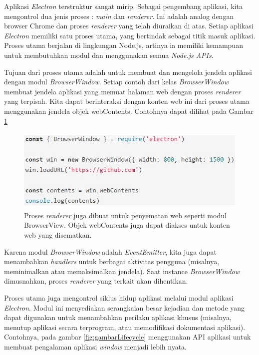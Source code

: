 Aplikasi \textit{Electron} terstruktur sangat mirip. Sebagai pengembang aplikasi, kita mengontrol dua jenis proses : \textit{main} dan \textit{renderer}. Ini adalah analog dengan browser Chrome dan proses \textit{renderer} yang telah diuraikan di atas. Setiap aplikasi \textit{Electron} memiliki satu proses utama, yang bertindak sebagai titik masuk aplikasi. Proses utama berjalan di lingkungan Node.js, artinya ia memiliki kemampuan untuk membutuhkan modul dan menggunakan semua \textit{Node.js APIs}.

Tujuan dari proses utama adalah untuk membuat dan mengelola jendela aplikasi dengan modul \textit{BrowserWindow}. Setiap contoh dari kelas \textit{BrowserWindow} membuat jendela aplikasi yang memuat halaman web dengan proses \textit{renderer} yang terpisah. Kita dapat berinteraksi dengan konten web ini dari proses utama menggunakan  jendela objek webContents. Contohnya dapat dilihat pada Gambar \ref{fig:gambarBrowserWindow}

\begin{figure}[H]
    \centering
    \includegraphics[width=12cm, height=4cm]{Gambar/BrowserWindow.jpg}
    \caption{Proses \textit{renderer} juga dibuat untuk penyematan web seperti modul BrowserView. Objek webContents juga dapat diakses untuk konten web yang disematkan.}
    \label{fig:gambarBrowserWindow}
\end{figure}

Karena modul \textit{BrowserWindow} adalah \textit{EventEmitter}, kita juga dapat menambahkan \textit{handlers} untuk berbagai aktivitas pengguna (misalnya, meminimalkan atau memaksimalkan jendela). Saat instance \textit{BrowserWindow} dimusnahkan, proses \textit{renderer} yang terkait akan dihentikan.

Proses utama juga mengontrol siklus hidup aplikasi melalui modul aplikasi \textit{Electron}. Modul ini menyediakan serangkaian besar kejadian dan metode yang dapat digunakan untuk menambahkan perilaku aplikasi khusus (misalnya, menutup aplikasi secara terprogram, atau memodifikasi dokumentasi aplikasi). Contohnya, pada gambar \ref{fig:gambarLifecycle} menggunakan API aplikasi untuk membuat pengalaman aplikasi \textit{window} menjadi lebih nyata.

